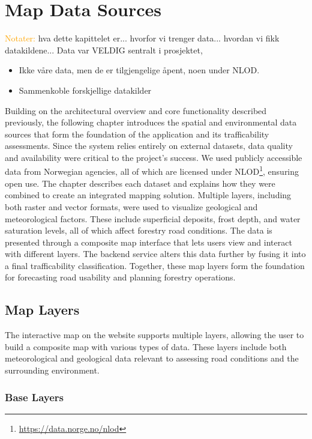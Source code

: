 \chapter{Map Data Sources}\label{chap:mapdatasources}

\textcolor{orange}{Notater:}
hva dette kapittelet er... hvorfor vi trenger data... hvordan vi fikk datakildene... 
Data var VELDIG sentralt i prosjektet, 
\begin{itemize}
    \item Ikke våre data, men de er tilgjengelige åpent, noen under NLOD.
    \item Sammenkoble forskjellige datakilder
\end{itemize}

Building on the architectural overview and core functionality described previously, the following chapter introduces the spatial and environmental data sources that form the foundation of the application and its trafficability assessments. Since the system relies entirely on external datasets, data quality and availability were critical to the project's success. We used publicly accessible data from Norwegian agencies, all of which are licensed under NLOD\footnote{\url{https://data.norge.no/nlod}}, ensuring open use. The chapter describes each dataset and explains how they were combined to create an integrated mapping solution. Multiple layers, including both raster and vector formats, were used to visualize geological and meteorological factors. These include superficial deposits, frost depth, and water saturation levels, all of which affect forestry road conditions. The data is presented through a composite map interface that lets users view and interact with different layers. The backend service alters this data further by fusing it into a final trafficability classification. Together, these map layers form the foundation for forecasting road usability and planning forestry operations.

\section{Map Layers}\label{sec:maplayers}

The interactive map on the website supports multiple layers, allowing the user to build a composite map with various types of data. These layers include both meteorological and geological data relevant to assessing road conditions and the surrounding environment.

\subsection{Base Layers}\label{subsec:baselayers}

